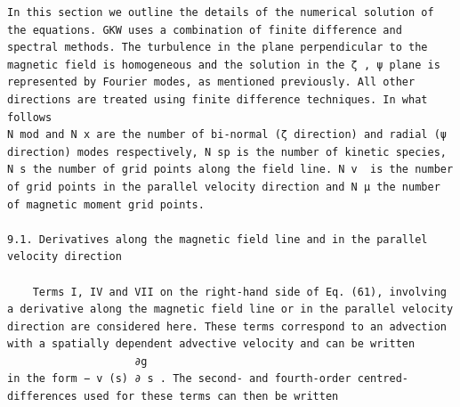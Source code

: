 \documentclass[a4paper]{article}
\newcommand{\gkwpagefont}{\fontsize{6.0pt}{7.55pt}\selectfont}
\begin{document}
\begin{Verbatim}[fontsize=\gkwpagefont]
    In this section we outline the details of the numerical solution of the equations. GKW uses a combination of finite difference and
spectral methods. The turbulence in the plane perpendicular to the magnetic field is homogeneous and the solution in the ζ , ψ plane is
represented by Fourier modes, as mentioned previously. All other directions are treated using finite difference techniques. In what follows
N mod and N x are the number of bi-normal (ζ direction) and radial (ψ direction) modes respectively, N sp is the number of kinetic species,
N s the number of grid points along the field line. N v  is the number of grid points in the parallel velocity direction and N μ the number
of magnetic moment grid points.

9.1. Derivatives along the magnetic field line and in the parallel velocity direction

    Terms I, IV and VII on the right-hand side of Eq. (61), involving a derivative along the magnetic field line or in the parallel velocity
direction are considered here. These terms correspond to an advection with a spatially dependent advective velocity and can be written
                    ∂g
in the form − v (s) ∂ s . The second- and fourth-order centred-differences used for these terms can then be written
\end{Verbatim}
\newpage
\end{document}
